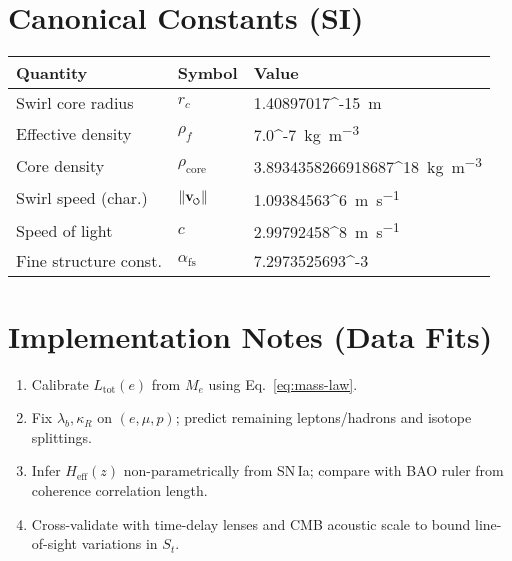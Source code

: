\documentclass[10pt,reprint,aps,onecolumn,nofootinbib]{revtex4-2}
\newcommand{\swirlarrow}{%
    \mathchoice{\mkern-2mu\scriptstyle\boldsymbol{\circlearrowleft}}%
    {\mkern-2mu\scriptstyle\boldsymbol{\circlearrowleft}}%
    {\mkern-2mu\scriptscriptstyle\boldsymbol{\circlearrowleft}}%
    {\mkern-2mu\scriptscriptstyle\boldsymbol{\circlearrowleft}}%
}
\newcommand{\vswirl}{\mathbf{v}_{\swirlarrow}}
\newcommand{\vnorm}{\lVert \vswirl \rVert}
\newcommand{\rhof}{\rho_{\!f}}
\newcommand{\rc}{r_c}
\newcommand{\vswirlval}{1.09384563\times 10^{6}\ \si{m.s^{-1}}}
\newcommand{\rcval}{1.40897017\times 10^{-15}\ \si{m}}
\newcommand{\rhofval}{7.0\times 10^{-7}\ \si{kg.m^{-3}}}
\newcommand{\rhocoreval}{3.8934358266918687\times 10^{18}\ \si{kg.m^{-3}}}
\newcommand{\cval}{2.99792458\times 10^{8}\ \si{m.s^{-1}}}
\newcommand{\alphafsval}{7.2973525693\times 10^{-3}}
\begin{document}
\section*{Canonical Constants (SI)}
\begin{table}[h]
\centering
\begin{tabular}{@{}lll@{}}
\toprule
Quantity & Symbol & Value \\
\midrule
Swirl core radius & \(\rc\) & \rcval \\
Effective density & \(\rhof\) & \rhofval \\
Core density & \(\rho_{\text{core}}\) & \rhocoreval \\
Swirl speed (char.) & \(\vnorm\) & \vswirlval \\
Speed of light & \(c\) & \cval \\
Fine structure const. & \(\alpha_{\mathrm{fs}}\) & \alphafsval \\
\bottomrule
\end{tabular}
\end{table}

\section*{Implementation Notes (Data Fits)}
\begin{enumerate}
  \item Calibrate \(L_{\text{tot}}(e)\) from \(M_e\) using Eq.~\eqref{eq:mass-law}.
  \item Fix \(\lambda_b,\kappa_R\) on \((e,\mu,p)\); predict remaining leptons/hadrons and isotope splittings.
  \item Infer \(H_{\text{eff}}(z)\) non-parametrically from SN\,Ia; compare with BAO ruler from coherence correlation length.
  \item Cross-validate with time-delay lenses and CMB acoustic scale to bound line-of-sight variations in \(S_t\).
\end{enumerate}

\end{document}
